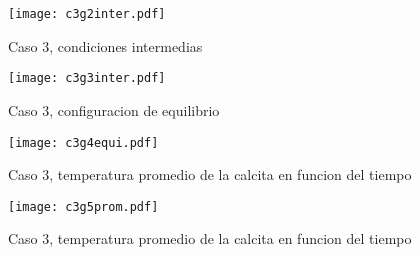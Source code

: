 \documentclass[reprint,amsmath,amssymb]{revtex4-1}
\begin{document}
\begin{figure}[h!]
    \centering
    \texttt{[image: c3g2inter.pdf]}
    \caption{Caso 3, condiciones intermedias}
\end{figure}

\begin{figure}[h!]
    \centering
    \texttt{[image: c3g3inter.pdf]}
    \caption{Caso 3, configuracion de equilibrio}
\end{figure}

\begin{figure}[h!]
    \centering
    \texttt{[image: c3g4equi.pdf]}
    \caption{Caso 3, temperatura promedio de la calcita en funcion del tiempo}
\end{figure}

\begin{figure}[h!]
    \centering
    \texttt{[image: c3g5prom.pdf]}
    \caption{Caso 3, temperatura promedio de la calcita en funcion del tiempo}
\end{figure}
\end{document}
